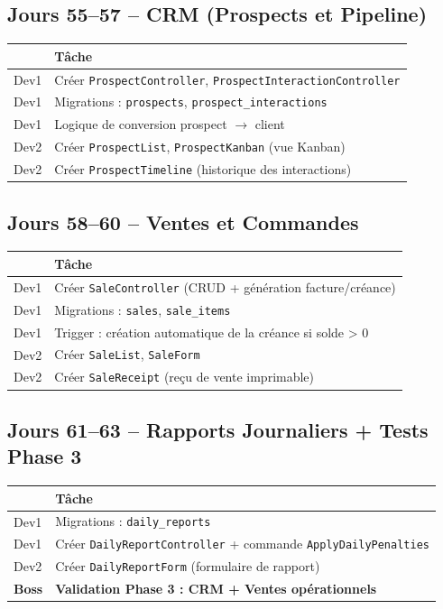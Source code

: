 \documentclass[12pt,a4paper]{report}
\begin{document}
\subsection*{Jours 55--57 -- CRM (Prospects et Pipeline)}

\begin{tabularx}{\textwidth}{l X}
    \toprule
    & \textbf{Tâche} \\
    \midrule
    Dev1 & Créer \texttt{ProspectController}, \texttt{ProspectInteractionController} \\
    Dev1 & Migrations : \texttt{prospects}, \texttt{prospect\_interactions} \\
    Dev1 & Logique de conversion prospect $\rightarrow$ client \\
    Dev2 & Créer \texttt{ProspectList}, \texttt{ProspectKanban} (vue Kanban) \\
    Dev2 & Créer \texttt{ProspectTimeline} (historique des interactions) \\
    \bottomrule
\end{tabularx}

\subsection*{Jours 58--60 -- Ventes et Commandes}

\begin{tabularx}{\textwidth}{l X}
    \toprule
    & \textbf{Tâche} \\
    \midrule
    Dev1 & Créer \texttt{SaleController} (CRUD + génération facture/créance) \\
    Dev1 & Migrations : \texttt{sales}, \texttt{sale\_items} \\
    Dev1 & Trigger : création automatique de la créance si solde > 0 \\
    Dev2 & Créer \texttt{SaleList}, \texttt{SaleForm} \\
    Dev2 & Créer \texttt{SaleReceipt} (reçu de vente imprimable) \\
    \bottomrule
\end{tabularx}

\subsection*{Jours 61--63 -- Rapports Journaliers + Tests Phase 3}

\begin{tabularx}{\textwidth}{l X}
    \toprule
    & \textbf{Tâche} \\
    \midrule
    Dev1 & Migrations : \texttt{daily\_reports} \\
    Dev1 & Créer \texttt{DailyReportController} + commande \texttt{ApplyDailyPenalties} \\
    Dev2 & Créer \texttt{DailyReportForm} (formulaire de rapport) \\
    \textbf{Boss} & \textbf{Validation Phase 3 : CRM + Ventes opérationnels} \\
    \bottomrule
\end{tabularx}
\end{document}
